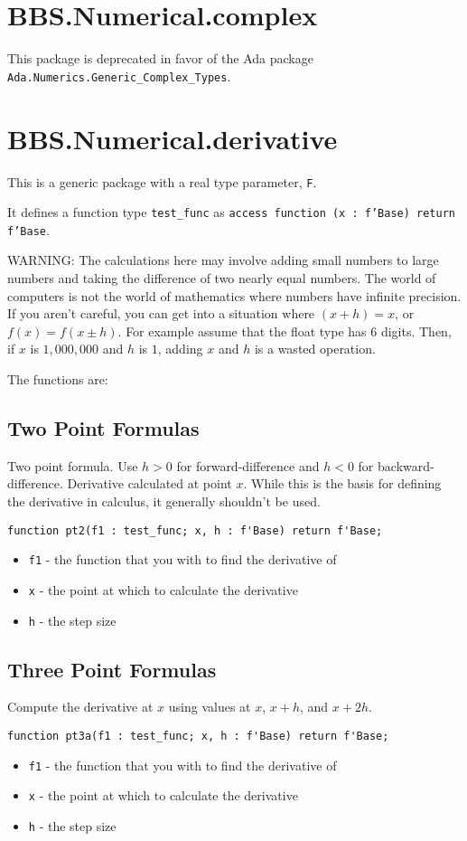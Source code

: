 \documentclass[10pt, openany]{book}
\newcommand{\package}[1]{\texttt{#1}}
\newcommand{\function}[1]{\texttt{#1}}
\newcommand{\datatype}[1]{\texttt{#1}}
\begin{document}
\section{BBS.Numerical.complex}
This package is deprecated in favor of the Ada package \package{Ada.Numerics.Generic\_Complex\_Types}.

\section{BBS.Numerical.derivative}
This is a generic package with a real type parameter, \datatype{F}.

It defines a function type \datatype{test\_func} as \datatype{access function (x : f'Base) return f'Base}.

WARNING:
The calculations here may involve adding small numbers to large numbers and taking the difference of two nearly equal numbers.
The world of computers is not the world of mathematics where numbers have infinite precision.  If you aren't careful, you can get into a situation where $(x + h) = x$, or $f(x) = f(x \pm h)$. For example assume that the float type has 6 digits.  Then, if $x$ is $1,000,000$ and $h$ is $1$, adding $x$ and $h$ is a wasted operation.

The functions are:
\subsection{Two Point Formulas}
Two point formula.  Use $h>0$ for forward-difference and $h<0$ for backward-difference.  Derivative calculated at point $x$.  While this is the basis for defining the derivative in calculus, it generally shouldn't be used.
\begin{lstlisting}
function pt2(f1 : test_func; x, h : f'Base) return f'Base;
\end{lstlisting}
\begin{itemize}
  \item \function{f1} - the function that you with to find the derivative of
  \item \function{x} - the point at which to calculate the derivative
  \item \function{h} - the step size
\end{itemize}

\subsection{Three Point Formulas}
Compute the derivative at $x$ using values at $x$, $x+h$, and $x+2h$.
\begin{lstlisting}
function pt3a(f1 : test_func; x, h : f'Base) return f'Base;
\end{lstlisting}
\begin{itemize}
  \item \function{f1} - the function that you with to find the derivative of
  \item \function{x} - the point at which to calculate the derivative
  \item \function{h} - the step size
\end{itemize}
\end{document}
